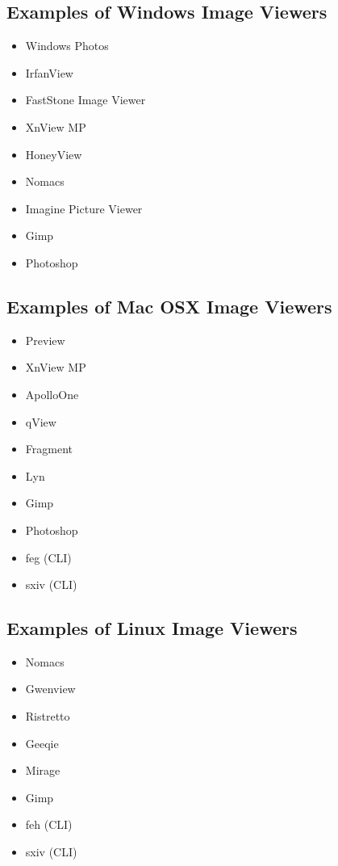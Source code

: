 \documentclass[12pt, letterpaper]{article}
\begin{document}
\subsection{Examples of Windows Image Viewers}
\begin{itemize}
	\item Windows Photos
	\item IrfanView
	\item FastStone Image Viewer
	\item XnView MP
	\item HoneyView
	\item Nomacs
	\item Imagine Picture Viewer
	\item Gimp
	\item Photoshop
\end{itemize}

\subsection{Examples of Mac OSX Image Viewers}
\begin{itemize}
	\item Preview
	\item XnView MP
	\item ApolloOne
	\item qView
	\item Fragment
	\item Lyn
	\item Gimp
	\item Photoshop
	\item feg (CLI)
	\item sxiv (CLI)
\end{itemize}

\subsection{Examples of Linux Image Viewers}
\begin{itemize}
	\item Nomacs
	\item Gwenview
	\item Ristretto
	\item Geeqie
	\item Mirage
	\item Gimp
	\item feh (CLI)
	\item sxiv (CLI)
\end{itemize}
\end{document}
